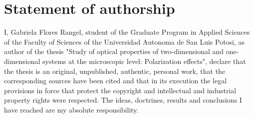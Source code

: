 \cleardoublepage
%	

\chapter{Statement of authorship}%
I, Gabriela Flores Rangel, student of the Graduate Program in Applied Sciences of the Faculty of Sciences of the Universidad Autonoma de San Luis Potosi, as author of the thesis "Study of optical properties of two-dimensional
and one-dimensional systems at the microscopic level: Polarization effects", declare that the thesis is an original, unpublished, authentic, personal work, that the corresponding sources have been cited and that in its execution the legal provisions in force that protect the copyright and intellectual and industrial property rights were respected. The ideas, doctrines, results and conclusions I have reached are my absolute responsibility.
 
\cleardoublepage

